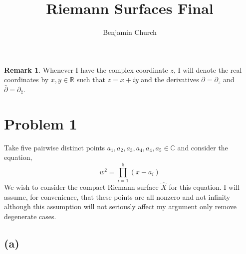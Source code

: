 \documentclass[12pt]{extarticle}
\title{Riemann Surfaces Final}
\author{Benjamin Church}
\newcommand{\R}{\mathbb{R}}
\newcommand{\C}{\mathbb{C}}
\theoremstyle{definition}
\newtheorem{remark}{Remark}
\begin{document}
\maketitle

\begin{remark}
Whenever I have the complex coordinate $z$, I will  denote the real coordinates by $x, y \in \R$ such that $z = x + iy$ and the derivatives $\partial = \partial_z$ and $\bar{\partial} = \partial_{\bar{z}}$.
\end{remark}

\section*{Problem 1}

Take five pairwise distinct points $a_1, a_2, a_3, a_4, a_4, a_5 \in \C$ and consider the equation,
\[ w^2 = \prod_{i = 1}^5 (x - a_i) \]
We wish to consider the compact Riemann surface $\hat{X}$ for this equation. I will assume, for convenience, that these points are all nonzero and not infinity although this assumption will not seriously affect my argument only remove degenerate cases.

\subsection*{(a)}
\end{document}
